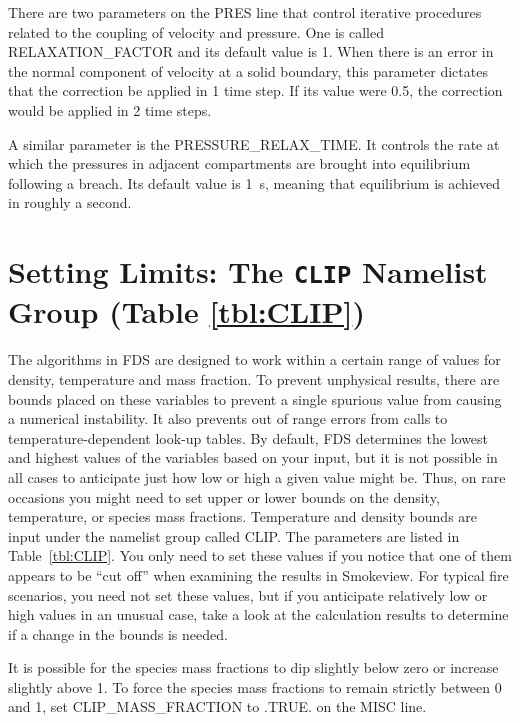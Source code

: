 \documentclass[11pt]{book}
\begin{document}
There are two parameters on the {\ct PRES} line that control iterative procedures related to the coupling of velocity and pressure. One is
called {\ct RELAXATION\_FACTOR} and its default value is 1. When there is an error in the normal component of velocity at a solid boundary, this
parameter dictates that the correction be applied in 1 time step. If its value were 0.5, the correction would be applied in 2 time steps.

A similar parameter is the {\ct PRESSURE\_RELAX\_TIME}. It controls the rate at which the pressures in adjacent compartments are brought into equilibrium following a
breach. Its default value is 1~s, meaning that equilibrium is achieved in roughly a second.




\section{Setting Limits: The \texorpdfstring{{\tt CLIP}}{CLIP} Namelist Group (Table \ref{tbl:CLIP})}
\label{info:CLIP}

The algorithms in FDS are designed to work within a certain range of values for density, temperature and mass fraction. To prevent unphysical results,
there are bounds placed on these variables to prevent a single spurious value from causing a numerical instability. It also prevents out of range
errors from calls to temperature-dependent look-up tables. By default, FDS determines the lowest and highest values of the variables based on your input, but it is not
possible in all cases to anticipate just how low or high a given value might be. Thus,
on rare occasions you might need to set upper or lower bounds on the density, temperature, or species mass fractions. Temperature and density bounds are input under the
namelist group called {\ct CLIP}. The parameters are listed in Table~\ref{tbl:CLIP}. You only need to set these values if you notice that one of them appears to be
``cut off'' when examining the results in Smokeview. For typical fire scenarios, you need not set these values, but if you anticipate relatively low or high values in an
unusual case, take a look at the calculation results to determine if a change in the bounds is needed.

It is possible for the species mass fractions to dip slightly below zero or increase slightly above 1. To force the species mass fractions to remain strictly between 0 and 1, set {\ct CLIP\_MASS\_FRACTION} to {\ct .TRUE.} on the {\ct MISC} line.
\end{document}
